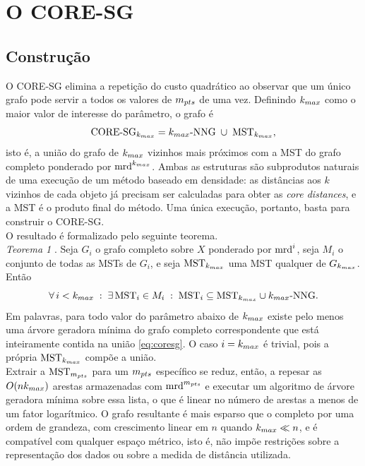 \section{O CORE-SG\label{sec:coresg-context}}

\subsection{Construção\label{sec:coresg-construction}}

O \ac{CORE-SG} \cite{core-sg} elimina a repetição do custo quadrático ao observar que um único grafo pode servir a todos os valores de $m_{pts}$ de uma vez. Definindo $k_{max}$ como o maior valor de interesse do parâmetro, o grafo é
\begin{equation}
\label{eq:coresg}
\mathrm{CORE\text{-}SG}_{k_{max}} = k_{max}\text{-}\mathrm{NNG} \;\cup\; \mathrm{MST}_{k_{max}},
\end{equation}
isto é, a união do grafo de $k_{max}$ vizinhos mais próximos com a \ac{MST} do grafo completo ponderado por $\mathrm{mrd}^{k_{max}}$. Ambas as estruturas são subprodutos naturais de uma execução de um método baseado em densidade: as distâncias aos $k$ vizinhos de cada objeto já precisam ser calculadas para obter as \textit{core distances}, e a \ac{MST} é o produto final do método. Uma única execução, portanto, basta para construir o \ac{CORE-SG}.\\

O resultado é formalizado pelo seguinte teorema.\\

\textit{Teorema 1} \cite{core-sg}. Seja $G_i$ o grafo completo sobre $X$ ponderado por $\mathrm{mrd}^{i}$, seja $M_i$ o conjunto de todas as \ac{MST}s de $G_i$, e seja $\mathrm{MST}_{k_{max}}$ uma \ac{MST} qualquer de $G_{k_{max}}$. Então
\[
\forall\, i < k_{max} \;:\; \exists\, \mathrm{MST}_i \in M_i \;:\; \mathrm{MST}_i \subseteq \mathrm{MST}_{k_{max}} \cup k_{max}\text{-}\mathrm{NNG}.
\]
Em palavras, para todo valor do parâmetro abaixo de $k_{max}$ existe pelo menos uma árvore geradora mínima do grafo completo correspondente que está inteiramente contida na união \eqref{eq:coresg}. O caso $i = k_{max}$ é trivial, pois a própria $\mathrm{MST}_{k_{max}}$ compõe a união.\\

Extrair a $\mathrm{MST}_{m_{pts}}$ para um $m_{pts}$ específico se reduz, então, a repesar as $O(nk_{max})$ arestas armazenadas com $\mathrm{mrd}^{m_{pts}}$ e executar um algoritmo de árvore geradora mínima sobre essa lista, o que é linear no número de arestas a menos de um fator logarítmico. O grafo resultante é mais esparso que o completo por uma ordem de grandeza, com crescimento linear em $n$ quando $k_{max} \ll n$, e é compatível com qualquer espaço métrico, isto é, não impõe restrições sobre a representação dos dados ou sobre a medida de distância utilizada.\\

